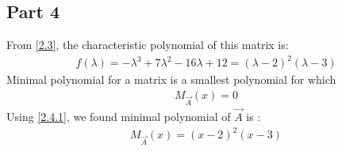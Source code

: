 \documentclass[journal,12pt,twocolumn]{IEEEtran}
\begin{document}
 \subsection{Part 4}
 From \eqref{2.3}, the characteristic polynomial of this matrix is: 
 \begin{align}
f(\lambda) = -{\lambda}^3+7{\lambda}^2 -16\lambda +12 = (\lambda - 2)^2 (\lambda - 3)
 \end{align}
 Minimal polynomial for a matrix is a smallest polynomial for which
 \begin{align}
 M_{\vec{A}}(x) = 0 \label{2.4.1}
 \end{align}
 Using \eqref{2.4.1}, we found minimal polynomial of $\vec{A}$ is :
 \begin{align}
 M_{\vec{A}}(x) = (x-2)^2(x-3)
 \end{align}	
\end{document}
